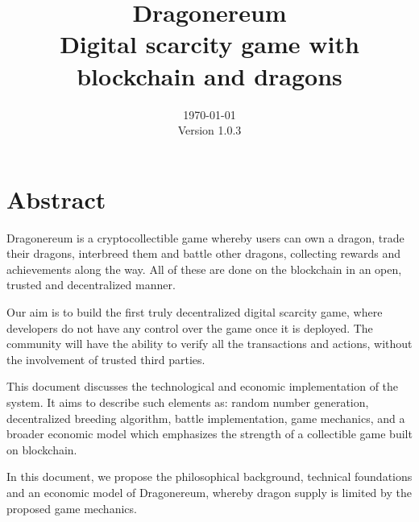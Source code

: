 \documentclass[12pt]{article}
\title{ \vspace{8cm}
        Dragonereum \\
		\normalsize Digital scarcity game with blockchain and dragons}
\date{\vspace{10.5cm}
        \today \\	
		\small Version 1.0.3}
\begin{document}
\sloppy %

\maketitle
\setlength{\parskip}{9.96pt}
 \par


\vspace{\baselineskip}

\vspace{\baselineskip}

\vspace{\baselineskip}
 \par

 \par

 \par



\section*{Abstract}
Dragonereum is a cryptocollectible game whereby users can own a dragon, trade their dragons, interbreed them and battle other dragons, collecting rewards and achievements along the way. All of these are done on the blockchain in an open, trusted and decentralized manner.\par

Our aim is to build the first truly decentralized digital scarcity game, where developers do not have any control over the game once it is deployed. The community will have the ability to verify all the transactions and actions, without the involvement of trusted third parties.\par

This document discusses the technological and economic implementation of the system. It aims to describe such elements as: random number generation, decentralized breeding algorithm, battle implementation, game mechanics, and a broader economic model which emphasizes the strength of a collectible game built on blockchain.\par

In this document, we propose the philosophical background, technical foundations and an economic model of Dragonereum, whereby dragon supply is limited by the proposed game mechanics.%

\end{document}
